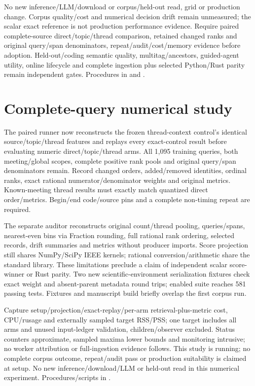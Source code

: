 \documentclass[11pt]{article}
\begin{document}
No new inference/LLM/download or corpus/held-out read, grid or production
change. Corpus quality/cost and numerical decision drift remain unmeasured;
the scalar exact reference is not production performance evidence. Require
paired complete-source direct/topic/thread comparison, retained changed ranks
and original query/span denominators, repeat/audit/cost/memory evidence before
adoption. Held-out/coding semantic quality, multitag/ancestors, guided-agent
utility, online lifecycle and complete ingestion plus selected Python/Rust
parity remain independent gates. Procedures in
 and
.

\section{Complete-query numerical study}
The paired runner now reconstructs the frozen thread-context control's identical
source/topic/thread features and replays every exact-control result before
evaluating numeric direct/topic/thread arms. All 1,095 training queries, both
meeting/global scopes, complete positive rank pools and original query/span
denominators remain. Record changed orders, added/removed identities, ordinal
ranks, exact rational numerator/denominator weights and original metrics.
Known-meeting thread results must exactly match quantized direct order/metrics.
Begin/end code/source pins and a complete non-timing repeat are required.

The separate auditor reconstructs original count/thread pooling, queries/spans,
nearest-even bins via Fraction rounding, full rational rank ordering, selected
records, drift summaries and metrics without producer imports. Score projection
still shares NumPy/SciPy IEEE kernels; rational conversion/arithmetic share the
standard library. These limitations preclude a claim of independent scalar
score-winner or Rust parity. Two new scientific-environment serialization
fixtures check exact weight and absent-parent metadata round trips; enabled
suite reaches 581 passing tests. Fixtures and manuscript build briefly overlap
the first corpus run.

Capture setup/projection/exact-replay/per-arm retrieval-plus-metric cost,
CPU/rusage and externally sampled target RSS/PSS; one target includes all arms
and unused input-ledger validation, children/observer excluded. Status counters
approximate, sampled maxima lower bounds and monitoring intrusive; no worker
attribution or full-ingestion evidence follows. This study is running; no
complete corpus outcome, repeat/audit pass or production suitability is claimed
at setup. No new inference/download/LLM or held-out read in this numerical
experiment. Procedures/scripts in
.
\end{document}
